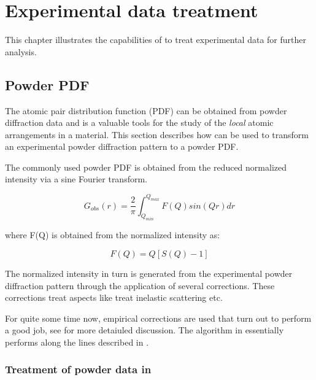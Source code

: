 
\chapter{Experimental data treatment \label{data}}

This chapter illustrates the capabilities of \Discus to treat experimental
data for further analysis.

\section{Powder PDF \label{data-pdf}}

The atomic pair distribution function (PDF) can be obtained from
powder diffraction data and is a valuable tools for the study of the
{\it local} atomic arrangements in a material. This section 
describes how \Discus can be used to transform an experimental powder
diffraction pattern to a powder PDF.

The commonly used powder PDF is obtained from the reduced normalized 
intensity via a sine Fourier transform.

\begin{equation}
  G_{obs}(r) = \frac{2}{\pi} \int_{Q_{min}}^{Q_{max}}  F(Q) sin(Qr) dr
  \label{eq_f2gr}
\end{equation}

where F(Q) is obtained from the normalized intensity as:
 
\begin{equation}
  F(Q)       = Q [ S(Q) - 1 ] 
\end{equation}

The normalized intensity in turn is generated from the experimental
powder diffraction pattern through the application of several corrections. 
These corrections treat aspects like treat inelastic scattering etc.

For quite some time now, empirical corrections are used that turn out to
perform a good job, see \cite{bifa2013} for more detaiuled discussion. 
The algorithm in \Discus essentially performs along the lines described 
in \cite{bifa2013}.

\subsection{Treatment of powder data in \Discus \label{data-pdf-treat}}


